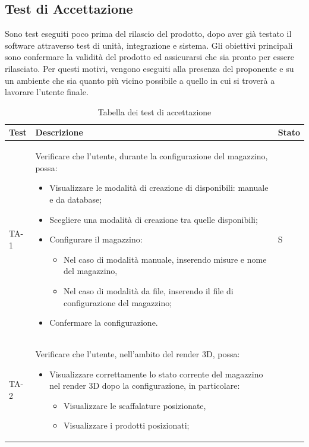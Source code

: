 \subsection{Test di Accettazione}
Sono test eseguiti poco prima del rilascio del prodotto, dopo aver già testato il software attraverso test di unità, integrazione e sistema. Gli obiettivi principali sono confermare la validità del prodotto ed assicurarsi che sia pronto per essere rilasciato. Per questi motivi, vengono eseguiti alla presenza del proponente e su un ambiente che sia quanto più vicino possibile a quello in cui si troverà a lavorare l'utente finale.
\renewcommand{\arraystretch}{1.5}
\begin{xltabular}{0.9\textwidth}{X | p{0.7\textwidth} | X}
    \textbf{\color{white} Test} & \textbf{\color{white} Descrizione} & \textbf{\color{white} Stato}\\ 
    \hline
    \endhead
    \caption{Tabella dei test di accettazione} 
    \label{tab:test_accettazione}
    \endlastfoot
    TA-1 & Verificare che l'utente, durante la configurazione del magazzino, possa:
    \begin{itemize}
        \item Visualizzare le modalità di creazione di disponibili: manuale e da database;
        \item Scegliere una modalità di creazione tra quelle disponibili;
        \item Configurare il magazzino:
        \begin{itemize}
            \item Nel caso di modalità manuale, inserendo misure e nome del magazzino,
            \item Nel caso di modalità da file, inserendo il file di configurazione del magazzino;
        \end{itemize}
        \item Confermare la configurazione.
    \end{itemize} 
    & S \\
    TA-2 & Verificare che l'utente, nell'ambito del render 3D, possa:
    \begin{itemize}
        \item Visualizzare correttamente lo stato corrente del magazzino nel render 3D dopo la configurazione, in particolare:
        \begin{itemize}
            \item Visualizzare le scaffalature posizionate,
            \item Visualizzare i prodotti posizionati;

\end{itemize}
\end{itemize}
\end{xltabular}
